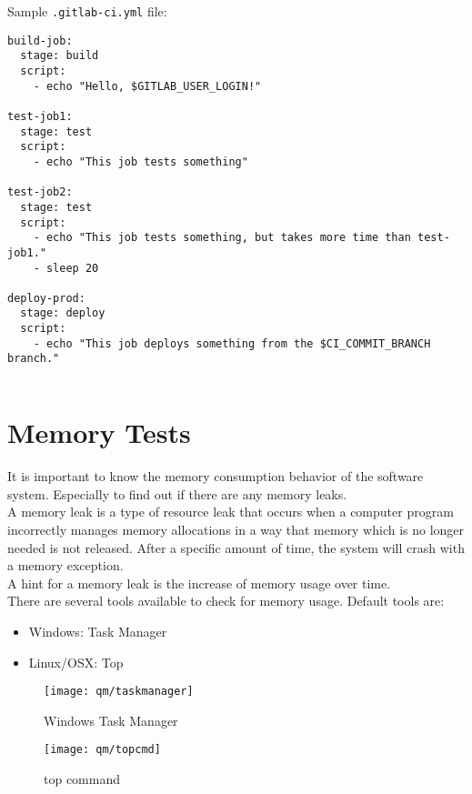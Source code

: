 Sample \verb|.gitlab-ci.yml| file:

\begin{lstlisting}
build-job:
  stage: build
  script:
    - echo "Hello, $GITLAB_USER_LOGIN!"

test-job1:
  stage: test
  script:
    - echo "This job tests something"

test-job2:
  stage: test
  script:
    - echo "This job tests something, but takes more time than test-job1."
    - sleep 20

deploy-prod:
  stage: deploy
  script:
    - echo "This job deploys something from the $CI_COMMIT_BRANCH branch."
\end{lstlisting}

\begin{lstlisting}

\end{lstlisting}



\section{Memory Tests}
It is important to know the memory consumption behavior of the
software system. Especially to find out if there are any memory leaks.\\
A memory leak is a type of resource leak that occurs when a computer
program incorrectly manages memory allocations in a way that memory which
is no longer needed is not released. After a specific amount of time,
the system will crash with a memory exception.\\
A hint for a memory leak is the increase of memory usage over time.\\
There are several tools available to check for memory usage. Default
tools are:

\begin{itemize}
\item Windows: Task Manager
\item Linux/OSX: Top
\end{itemize}

\begin{figure}[H]
  \centering
  \texttt{[image: qm/taskmanager]}
  \caption{Windows Task Manager}
\end{figure}

\vspace{3mm}

\begin{figure}[H]
  \centering
  \texttt{[image: qm/topcmd]}
  \caption{top command}
\end{figure}

